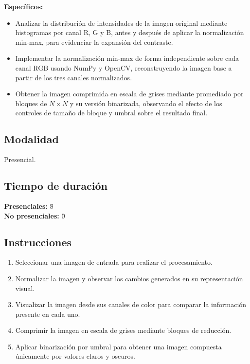 \documentclass[11pt]{article}
\begin{document}
\textbf{Específicos:}
\begin{itemize}
    \item Analizar la distribución de intensidades de la imagen original mediante histogramas por canal R, G y B, antes y después de aplicar la normalización min-max, para evidenciar la expansión del contraste.
    \item Implementar la normalización min-max de forma independiente sobre cada canal RGB usando NumPy y OpenCV, reconstruyendo la imagen base a partir de los tres canales normalizados.
    \item Obtener la imagen comprimida en escala de grises mediante promediado por bloques de $N \times N$ y su versión binarizada, observando el efecto de los controles de tamaño de bloque y umbral sobre el resultado final.
\end{itemize}

\subsection{Modalidad}
\begin{tabbing}
    \hspace{1cm} \= Presencial.
\end{tabbing}

\subsection{Tiempo de duración}
\begin{tabbing}
    \hspace{1cm} \= \textbf{Presenciales:} \= 8 \\
    \hspace{1cm} \= \textbf{No presenciales:} \= 0
\end{tabbing}

\subsection{Instrucciones}
\begin{enumerate}
    \item Seleccionar una imagen de entrada para realizar el procesamiento.
    \item Normalizar la imagen y observar los cambios generados en su representación visual.
    \item Visualizar la imagen desde sus canales de color para comparar la información presente en cada uno.
    \item Comprimir la imagen en escala de grises mediante bloques de reducción.
    \item Aplicar binarización por umbral para obtener una imagen compuesta únicamente por valores claros y oscuros.
\end{enumerate}
\end{document}
